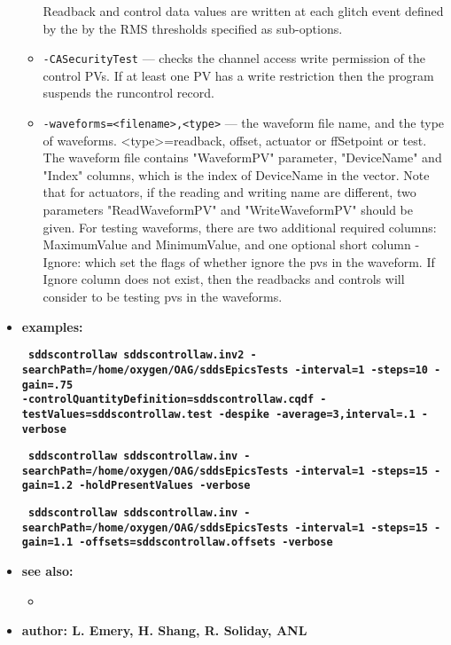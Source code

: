 \begin{itemize}
\begin{itemize}
                  Readback and control data values
               are written at each glitch event defined by the
               by the RMS thresholds specified as sub-options.
        \item {\tt -CASecurityTest} --- checks the channel access write permission of the control PVs.
               If at least one PV has a write restriction then the program suspends
               the runcontrol record.
        \item {\tt -waveforms=<filename>,<type>} --- the waveform file name, and the type of
               waveforms. <type>=readback, offset, actuator or ffSetpoint or test.
               The waveform file contains "WaveformPV" parameter, 
               "DeviceName" and "Index" columns, which is the index of DeviceName in 
               the vector. Note that for actuators, if the reading and writing name are
               different, two parameters "ReadWaveformPV" and "WriteWaveformPV" 
               should be given. For testing waveforms, there are two additional required columns: 
               MaximumValue and MinimumValue, and one optional short column - Ignore: 
               which set the flags of whether ignore the pvs in the waveform. If Ignore column 
               does not exist, then the readbacks and controls will consider to be testing pvs 
               in the waveforms.        
    \end{itemize}

\item {\bf examples:}
     \begin{flushleft}{\tt \bf
        sddscontrollaw sddscontrollaw.inv2 -searchPath=/home/oxygen/OAG/sddsEpicsTests -interval=1 -steps=10 -gain=.75 \\
         -controlQuantityDefinition=sddscontrollaw.cqdf -testValues=sddscontrollaw.test -despike -average=3,interval=.1 -verbose
     }\end{flushleft}

      \begin{flushleft}{\tt \bf
     sddscontrollaw sddscontrollaw.inv -searchPath=/home/oxygen/OAG/sddsEpicsTests  -interval=1 -steps=15 -gain=1.2 -holdPresentValues -verbose
      }\end{flushleft}

     \begin{flushleft}{\tt \bf
     sddscontrollaw sddscontrollaw.inv -searchPath=/home/oxygen/OAG/sddsEpicsTests  -interval=1 -steps=15 -gain=1.1 -offsets=sddscontrollaw.offsets -verbose
     }\end{flushleft}
        
\item {\bf see also:}
 
%
%    
    \begin{itemize}
    \item {}
    \end{itemize}
%
%
\item {\bf author: L. Emery, H. Shang, R. Soliday, ANL}
\end{itemize}
